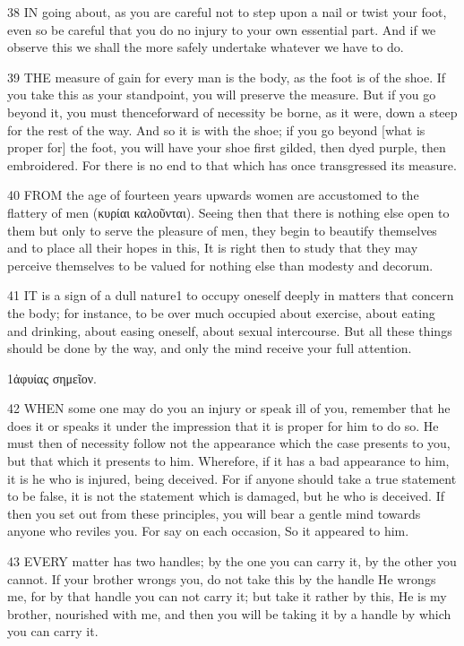    38   IN going about, as you are careful not to step upon a nail or twist your foot, even so be careful that you do no injury to your own essential part. And if we observe this we shall the more safely undertake whatever we have to do.

    39   THE measure of gain for every man is the body, as the foot is of the shoe. If you take this as your standpoint, you will preserve the measure. But if you go beyond it, you must thenceforward of necessity be borne, as it were, down a steep for the rest of the way. And so it is with the shoe; if you go beyond [what is proper for] the foot, you will have your shoe first gilded, then dyed purple, then embroidered. For there is no end to that which has once transgressed its measure.

    40   FROM the age of fourteen years upwards women are accustomed to the flattery of men (κυρίαι καλοῦνται).  Seeing then that there is nothing else open to them but only to serve the pleasure of men, they begin to beautify themselves and to place all their hopes in this, It is right then to study that they may perceive themselves to be valued for nothing else than modesty and decorum.

    41   IT is a sign of a dull nature1  to occupy oneself deeply in matters that concern the body; for instance, to be over much occupied about exercise, about eating and drinking, about easing oneself, about sexual intercourse. But all these things should be done by the way, and only the mind receive your full attention.

    1ἀφυίας σημεῖον.

    42   WHEN some one may do you an injury or speak ill of you, remember that he does it or speaks it under the impression that it is proper for him to do so. He must then of necessity follow not the appearance which the case presents to you, but that which it presents to him. Wherefore, if it has a bad appearance to him, it is he who is injured, being deceived. For if anyone should take a true statement to be false, it is not the statement which is damaged, but he who is deceived. If then you set out from these principles, you will bear a gentle mind towards anyone who reviles you. For say on each occasion, So it appeared to him.

    43   EVERY matter has two handles; by the one you can carry it, by the other you cannot. If your brother wrongs you, do not take this by the handle He wrongs me, for by that handle you can not carry it; but take it rather by this, He is my brother, nourished with me, and then you will be taking it by a handle by which you can carry it.

